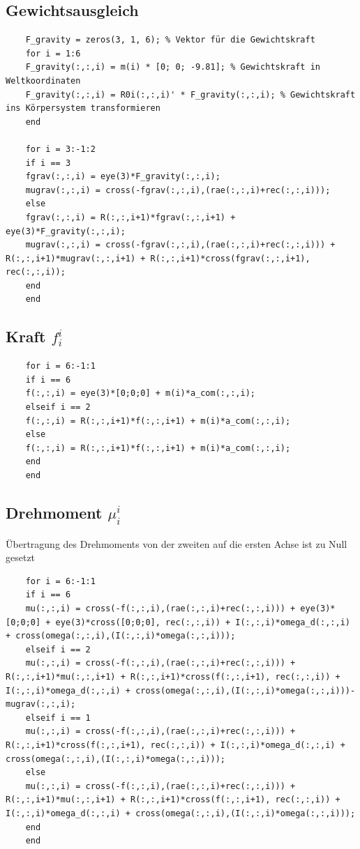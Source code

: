 \subsection*{Gewichtsausgleich}
%
\begin{lstlisting}
	F_gravity = zeros(3, 1, 6); % Vektor für die Gewichtskraft
	for i = 1:6
	F_gravity(:,:,i) = m(i) * [0; 0; -9.81]; % Gewichtskraft in Weltkoordinaten
	F_gravity(:,:,i) = R0i(:,:,i)' * F_gravity(:,:,i); % Gewichtskraft ins Körpersystem transformieren
	end
	
	for i = 3:-1:2
	if i == 3
	fgrav(:,:,i) = eye(3)*F_gravity(:,:,i);
	mugrav(:,:,i) = cross(-fgrav(:,:,i),(rae(:,:,i)+rec(:,:,i)));
	else
	fgrav(:,:,i) = R(:,:,i+1)*fgrav(:,:,i+1) + eye(3)*F_gravity(:,:,i);
	mugrav(:,:,i) = cross(-fgrav(:,:,i),(rae(:,:,i)+rec(:,:,i))) + R(:,:,i+1)*mugrav(:,:,i+1) + R(:,:,i+1)*cross(fgrav(:,:,i+1), rec(:,:,i));
	end
	end
\end{lstlisting}
%
\subsection*{Kraft $f^{i}_i$}
%
\begin{lstlisting}
	for i = 6:-1:1
	if i == 6
	f(:,:,i) = eye(3)*[0;0;0] + m(i)*a_com(:,:,i);
	elseif i == 2
	f(:,:,i) = R(:,:,i+1)*f(:,:,i+1) + m(i)*a_com(:,:,i);
	else
	f(:,:,i) = R(:,:,i+1)*f(:,:,i+1) + m(i)*a_com(:,:,i);
	end
	end
\end{lstlisting}
%
\subsection*{Drehmoment $\mu^{i}_i$}
%
\begin{par}
	Übertragung des Drehmoments von der zweiten auf die ersten Achse ist zu Null gesetzt
\end{par} \vspace{1em}
\begin{lstlisting}
	for i = 6:-1:1
	if i == 6
	mu(:,:,i) = cross(-f(:,:,i),(rae(:,:,i)+rec(:,:,i))) + eye(3)*[0;0;0] + eye(3)*cross([0;0;0], rec(:,:,i)) + I(:,:,i)*omega_d(:,:,i) + cross(omega(:,:,i),(I(:,:,i)*omega(:,:,i)));
	elseif i == 2
	mu(:,:,i) = cross(-f(:,:,i),(rae(:,:,i)+rec(:,:,i))) + R(:,:,i+1)*mu(:,:,i+1) + R(:,:,i+1)*cross(f(:,:,i+1), rec(:,:,i)) + I(:,:,i)*omega_d(:,:,i) + cross(omega(:,:,i),(I(:,:,i)*omega(:,:,i)))- mugrav(:,:,i);
	elseif i == 1
	mu(:,:,i) = cross(-f(:,:,i),(rae(:,:,i)+rec(:,:,i))) + R(:,:,i+1)*cross(f(:,:,i+1), rec(:,:,i)) + I(:,:,i)*omega_d(:,:,i) + cross(omega(:,:,i),(I(:,:,i)*omega(:,:,i)));
	else
	mu(:,:,i) = cross(-f(:,:,i),(rae(:,:,i)+rec(:,:,i))) + R(:,:,i+1)*mu(:,:,i+1) + R(:,:,i+1)*cross(f(:,:,i+1), rec(:,:,i)) + I(:,:,i)*omega_d(:,:,i) + cross(omega(:,:,i),(I(:,:,i)*omega(:,:,i)));
	end
	end
\end{lstlisting}
%
